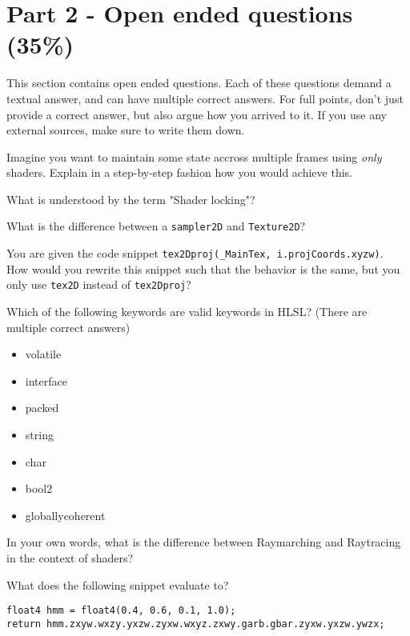 \documentclass{exam}
\begin{document}
\newpage\section*{Part 2 - Open ended questions (35\%)}
This section contains open ended questions. Each of these questions demand a textual answer, and can have multiple correct answers. For full points, don't just provide a correct answer, but also argue how you arrived to it. If you use any external sources, make sure to write them down.
\begin{questions}
\question Imagine you want to maintain some state accross multiple frames using \textit{only} shaders. Explain in a step-by-step fashion how you would achieve this.
\vspace{100pt}

\question What is understood by the term "Shader locking"?
\vspace{100pt}

\question What is the difference between a \texttt{sampler2D} and \texttt{Texture2D}?
\vspace{100pt}

\question You are given the code snippet \texttt{tex2Dproj(\_MainTex, i.projCoords.xyzw)}. \\How would you rewrite this snippet such that the behavior is the same, but you only use \texttt{tex2D} instead of \texttt{tex2Dproj}?
\vspace{100pt}

\question Which of the following keywords are valid keywords in HLSL? (There are multiple correct answers)
\begin{itemize}
    \item volatile
    \item interface
    \item packed
    \item string
    \item char
    \item bool2
    \item globallycoherent
\end{itemize}
\vspace{100pt}

\question In your own words, what is the difference between Raymarching and Raytracing in the context of shaders?
\vspace{100pt}

\question What does the following snippet evaluate to?
\begin{verbatim}
float4 hmm = float4(0.4, 0.6, 0.1, 1.0);
return hmm.zxyw.wxzy.yxzw.zyxw.wxyz.zxwy.garb.gbar.zyxw.yxzw.ywzx;
\end{verbatim}
\vspace{100pt}


\end{questions}
\end{document}
